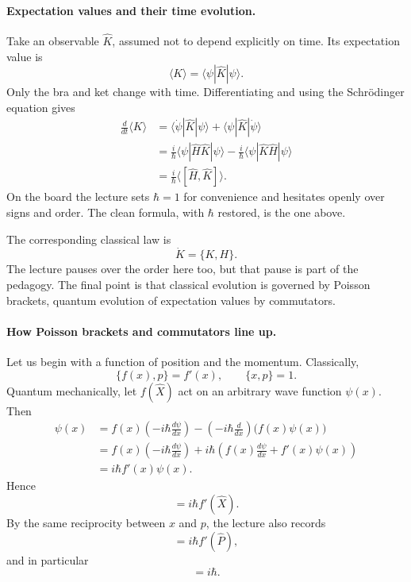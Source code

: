\paragraph{Expectation values and their time evolution.}
Take an observable \(\hat K\), assumed not to depend explicitly on time. Its expectation value is
\begin{equation}
\langle K\rangle=\langle\psi|\hat K|\psi\rangle.
\end{equation}
Only the bra and ket change with time. Differentiating and using the Schr\"odinger equation gives
\begin{align}
\frac{d}{dt}\langle K\rangle
&=
\langle \dot\psi|\hat K|\psi\rangle
+
\langle\psi|\hat K|\dot\psi\rangle \\
&=
\frac{i}{\hbar}\langle\psi|\hat H\hat K|\psi\rangle
-
\frac{i}{\hbar}\langle\psi|\hat K\hat H|\psi\rangle \\
&=
\frac{i}{\hbar}\langle[\hat H,\hat K]\rangle.
\end{align}
On the board the lecture sets \(\hbar=1\) for convenience and hesitates openly over signs and order. The clean formula, with \(\hbar\) restored, is the one above.

The corresponding classical law is
\begin{equation}
\dot K=\{K,H\}.
\end{equation}
The lecture pauses over the order here too, but that pause is part of the pedagogy. The final point is that classical evolution is governed by Poisson brackets, quantum evolution of expectation values by commutators.

\paragraph{How Poisson brackets and commutators line up.}
Let us begin with a function of position and the momentum. Classically,
\begin{equation}
\{f(x),p\}=f'(x),
\qquad
\{x,p\}=1.
\end{equation}
Quantum mechanically, let \(f(\hat X)\) act on an arbitrary wave function \(\psi(x)\). Then
\begin{align}
[f(\hat X),\hat P]\psi(x)
&=
f(x)\left(-i\hbar\frac{d\psi}{dx}\right)
-
\left(-i\hbar\frac{d}{dx}\right)\bigl(f(x)\psi(x)\bigr) \\
&=
f(x)\left(-i\hbar\frac{d\psi}{dx}\right)
+
i\hbar
\left(
f(x)\frac{d\psi}{dx}+f'(x)\psi(x)
\right) \\
&=
i\hbar f'(x)\psi(x).
\end{align}
Hence
\begin{equation}
[f(\hat X),\hat P]=i\hbar f'(\hat X).
\end{equation}
By the same reciprocity between \(x\) and \(p\), the lecture also records
\begin{equation}
[\hat X,f(\hat P)]=i\hbar f'(\hat P),
\end{equation}
and in particular
\begin{equation}
[\hat X,\hat P]=i\hbar.
\end{equation}

